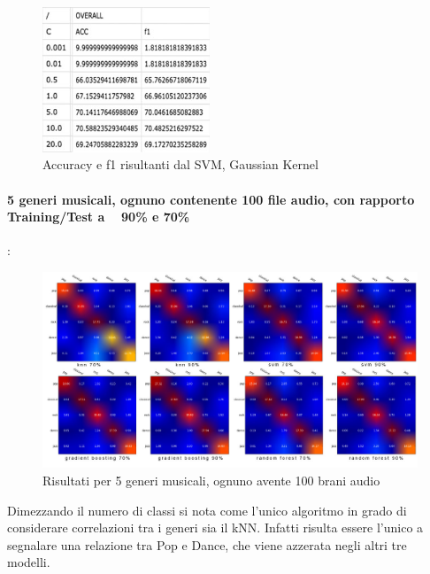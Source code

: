 \documentclass[%
 reprint,
 amsmath,amssymb,
 aps,
 article,
]{revtex4-1}
\begin{document}
\begin{figure} [h!]
  \includegraphics[width=50mm,scale=0.5]{images/params.jpg}
  \caption{Accuracy e f1 risultanti dal SVM, Gaussian Kernel}
  \label{fig:r_svm_gaussia_paramsl}
\end{figure}


\paragraph{5 generi musicali, ognuno contenente 100 file audio, con rapporto Training/Test a ~ 90\% e 70\%}:

\begin{figure} [h!]
  \includegraphics[width=\linewidth]{images/Results-100tracksPerGenre-5genres.jpg}
  \caption{Risultati per 5 generi musicali, ognuno avente 100 brani audio}
  \label{fig:r_5_100}
\end{figure}

Dimezzando il numero di classi si nota come l'unico algoritmo in grado di considerare correlazioni tra i generi sia il kNN. Infatti risulta essere l'unico a segnalare una relazione tra Pop e Dance, che viene azzerata negli altri tre modelli. 
\end{document}

